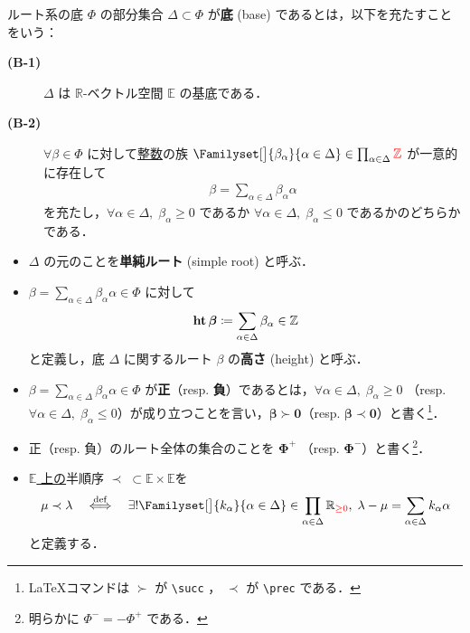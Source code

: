 \documentclass[rep_main]{subfiles}
\begin{document}
\begin{mydef}[label=def:base-root,breakable]{ルート系の底}
	$\Phi$ の部分集合 $\Delta \subset \Phi$ が\textbf{底} (base) であるとは，以下を充たすことをいう：
	\begin{description}
		\item[\textbf{(B-1)}] $\Delta$ は $\mathbb{R}$-ベクトル空間 $\mathbb{E}$ の基底である．
		\item[\textbf{(B-2)}] $\forall \beta \in \Phi$ に対して\underline{整数}の族 $\Familyset[\big]{\beta_\alpha}{\alpha \in \Delta} \in \prod_{\alpha \in \Delta} \textcolor{red}{\mathbb{Z}}$ が一意的に存在して
		\begin{align}
			\beta = \sum_{\alpha \in \Delta} \beta_\alpha \alpha
		\end{align}
		を充たし，$\forall \alpha \in \Delta,\; \beta_\alpha \ge 0$ であるか $\forall \alpha \in \Delta,\; \beta_\alpha \le 0$ であるかのどちらかである．
	\end{description}
	\tcblower
	\begin{itemize}
		\item $\Delta$ の元のことを\textbf{単純ルート} (simple root) と呼ぶ．
		\item $\beta = \sum_{\alpha \in \Delta} \beta_\alpha \alpha \in \Phi$ に対して
		\begin{align}
			\bm{\hight \beta} \coloneqq \sum_{\alpha \in \Delta} \beta_\alpha \in \mathbb{Z}
		\end{align}
		と定義し，底 $\Delta$ に関するルート $\beta$ の\textbf{高さ} (height) と呼ぶ． 
		\item $\beta = \sum_{\alpha \in \Delta} \beta_\alpha \alpha \in \Phi$ が\textbf{正}（resp. \textbf{負}）であるとは，$\forall \alpha \in \Delta,\; \beta_\alpha \ge 0$ （resp. $\forall \alpha \in \Delta,\; \beta_\alpha \le 0$）が成り立つことを言い，$\bm{\beta \succ 0}$（resp. $\bm{\beta \prec 0}$）と書く\footnote{\LaTeX コマンドは $\succ$ が \texttt{\textbackslash succ} ， $\prec$ が \texttt{\textbackslash prec} である．}．
		\item 正（resp. 負）のルート全体の集合のことを $\bm{\Phi^+}$ （resp. $\bm{\Phi^-}$）と書く\footnote{明らかに $\Phi^- = - \Phi^+$ である．}．
		\item \underline{$\mathbb{E}$ 上の}半順序 $\bm{\prec}\; \subset \mathbb{E} \times \mathbb{E}$を
		\begin{align}
			\mu \prec \lambda \DEF  \exists! \Familyset[\big]{k_\alpha}{\alpha \in \Delta} \in \prod_{\alpha \in \Delta} \mathbb{R}_{\textcolor{red}{\ge 0}},\; \lambda - \mu = \sum_{\alpha \in \Delta} k_\alpha \alpha
		\end{align}
		と定義する．
	\end{itemize}
\end{mydef}
\end{document}
